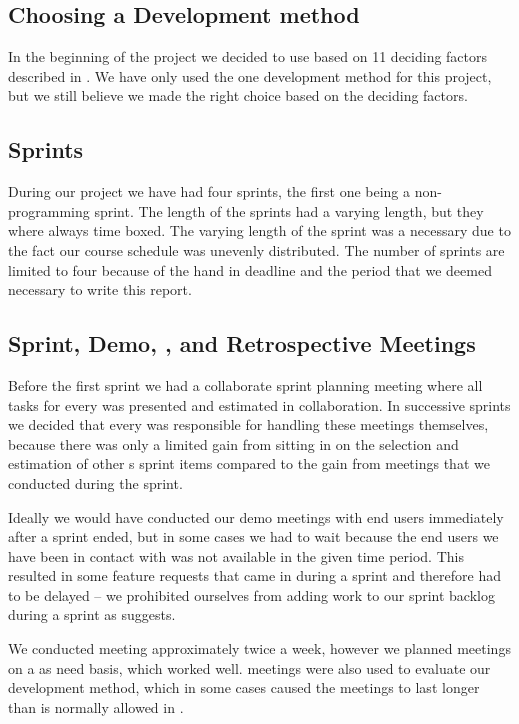 \subsection{Choosing a Development method}
In the beginning of the project we decided to use \sos{} based on 11 deciding factors described in .
We have only used the one development method for this project, but we still believe we made the right choice based on the deciding factors.



\subsection{Sprints}
During our project we have had four sprints, the first one being a non-programming sprint.
The length of the sprints had a varying length, but they where always time boxed. 
The varying length of the sprint was a necessary due to the fact our course schedule was unevenly distributed. 
The number of sprints are limited to four because of the hand in deadline and the period that we deemed necessary to write this report.




\subsection{Sprint, Demo, \sos{}, and Retrospective Meetings}
Before the first sprint we had a collaborate sprint planning meeting where all tasks for every \subgroup{} was presented and estimated in collaboration.
In successive sprints we decided that every \subgroup{} was responsible for handling these meetings themselves, because there was only a limited gain from sitting in on the selection and estimation of other \subgroup{}s sprint items compared to the gain from \sos{} meetings that we conducted during the sprint.

Ideally we would have conducted our demo meetings with end users immediately after a sprint ended, but in some cases we had to wait because the end users we have been in contact with was not available in the given time period.
This resulted in some feature requests that came in during a sprint and therefore had to be delayed -- we prohibited ourselves from adding work to our sprint backlog during a sprint as \scrum{} suggests.

We conducted \sos{} meeting approximately twice a week, however we planned meetings on a as need basis, which worked well.
\sos{} meetings were also used to evaluate our development method, which in some cases caused the meetings to last longer than is normally allowed in \sos{}.

